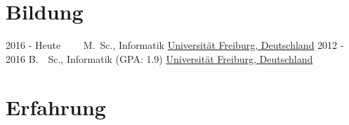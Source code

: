 \documentclass[letterpaper]{twentysecondcv_german} %
\begin{document}
\makeprofile %

\section{Bildung}

\begin{twenty} %
	\twentyitem
    	{2016 - Heute~~~~}
        {}
        {M.~Sc., Informatik}
        {\href{https://www.uni-freiburg.de/}{Universität Freiburg, Deutschland}}
        {}
        {}
	\twentyitem
    	{2012 - 2016}
		{}
        {B.~~Sc., Informatik \textnormal{(GPA: 1.9)}}
        {\href{https://www.uni-freiburg.de/}{Universität Freiburg, Deutschland}}
        {}
        {}
\end{twenty}


\section{Erfahrung}
\end{document}
